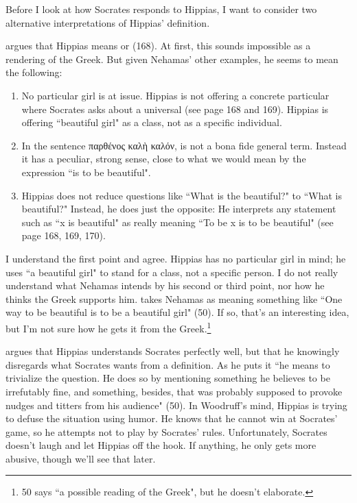 \documentclass[12pt]{article}
\begin{document}
Before I look at how Socrates responds to Hippias, I want to consider two alternative interpretations of Hippias' definition.

\citet{nehamas1975a} argues that Hippias means  or  (168).  At first, this sounds impossible as a rendering of the Greek.  But given Nehamas' other examples, he seems to mean the following:

\begin{enumerate}
    \item No particular girl is at issue.  Hippias is not offering a concrete particular where Socrates asks about a universal (see page 168 and 169).  Hippias is offering ``beautiful girl" as a class, not as a specific individual.
    \item In the sentence {\g παρθένος καλὴ καλόν},  is not a bona fide general term. Instead it has a peculiar, strong sense, close to what we would mean by the expression ``is to be beautiful".
    \item Hippias does not reduce questions like ``What is the beautiful?" to ``What is beautiful?"  Instead, he does just the opposite: He interprets any statement such as ``x is beautiful" as really meaning ``To be x is to be beautiful" (see page 168, 169, 170).
\end{enumerate}

I understand the first point and agree.  Hippias has no particular girl in mind; he uses ``a beautiful girl" to stand for a class, not a specific person. I do not really understand what Nehamas intends by his second or third point, nor how he thinks the Greek supports him.  \citet{woodruff1982} takes Nehamas as meaning something like ``One way to be beautiful is to be a beautiful girl" (50).  If so, that's an interesting idea, but I'm not sure how he gets it from the Greek.\footnote{\citet{woodruff1982} 50 says ``a possible reading of the Greek", but he doesn't elaborate.}

\citet{woodruff1982} argues that Hippias understands Socrates perfectly well, but that he knowingly disregards what Socrates wants from a definition.  As he puts it ``he means to trivialize the question.  He does so by mentioning something he believes to be irrefutably fine, and something, besides, that was probably supposed to provoke nudges and titters from his audience" (50).  In Woodruff's mind, Hippias is trying to defuse the situation using humor.  He knows that he cannot win at Socrates' game, so he attempts not to play by Socrates' rules.  Unfortunately, Socrates doesn't laugh and let Hippias off the hook.  If anything, he only gets more abusive, though we'll see that later.
\end{document}
